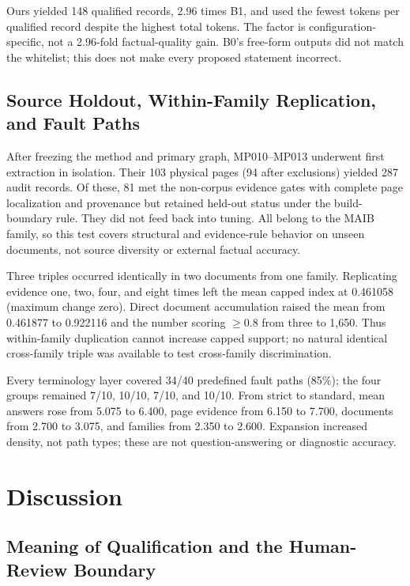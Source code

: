 \documentclass[conference,a4paper]{IEEEtran}
\begin{document}
Ours yielded 148 qualified records, 2.96 times B1, and used the fewest tokens per qualified record despite the highest total tokens. The factor is configuration-specific, not a 2.96-fold factual-quality gain. B0's free-form outputs did not match the whitelist; this does not make every proposed statement incorrect.

\subsection{Source Holdout, Within-Family Replication, and Fault Paths}

After freezing the method and primary graph, MP010--MP013 underwent first extraction in isolation. Their 103 physical pages (94 after exclusions) yielded 287 audit records. Of these, 81 met the non-corpus evidence gates with complete page localization and provenance but retained held-out status under the build-boundary rule. They did not feed back into tuning. All belong to the MAIB family, so this test covers structural and evidence-rule behavior on unseen documents, not source diversity or external factual accuracy.

Three triples occurred identically in two documents from one family. Replicating evidence one, two, four, and eight times left the mean capped index at 0.461058 (maximum change zero). Direct document accumulation raised the mean from 0.461877 to 0.922116 and the number scoring $\geq0.8$ from three to 1,650. Thus within-family duplication cannot increase capped support; no natural identical cross-family triple was available to test cross-family discrimination.

Every terminology layer covered 34/40 predefined fault paths (85\%); the four groups remained 7/10, 10/10, 7/10, and 10/10. From strict to standard, mean answers rose from 5.075 to 6.400, page evidence from 6.150 to 7.700, documents from 2.700 to 3.075, and families from 2.350 to 2.600. Expansion increased density, not path types; these are not question-answering or diagnostic accuracy.

\section{Discussion}

\subsection{Meaning of Qualification and the Human-Review Boundary}
\end{document}
